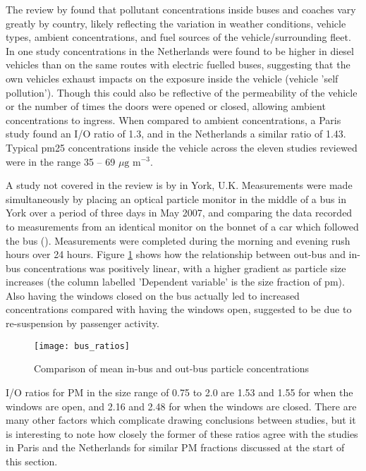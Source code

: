The review by \cite{Karanasiou2014} found that pollutant concentrations inside buses and coaches vary greatly by country, likely reflecting the variation in weather conditions, vehicle types, ambient concentrations, and fuel sources of the vehicle/surrounding fleet. In one study concentrations in the Netherlands were found to be higher in diesel vehicles than on the same routes with electric fuelled buses, suggesting that the own vehicles exhaust impacts on the exposure inside the vehicle (vehicle 'self pollution'). Though this could also be reflective of the permeability of the vehicle or the number of times the doors were opened or closed, allowing ambient concentrations to ingress. When compared to ambient concentrations, a Paris study found an I/O ratio of 1.3, and in the Netherlands a similar ratio of 1.43. Typical \gls{pm25} concentrations inside the vehicle across the eleven studies reviewed were in the range 35 -- 69 $\mu \text{g m}^{-3}$.

A study not covered in the review is by \cite{Song2009} in York, U.K. Measurements were made simultaneously by placing an optical particle monitor in the middle of a bus in York over a period of three days in May 2007, and comparing the data recorded to measurements from an identical monitor on the bonnet of a car which followed the bus (\cite{Song2009}). Measurements were completed during the morning and evening rush hours over 24 hours. Figure \ref{fig:bus_ratios} shows how the relationship between out-bus and in-bus concentrations was positively linear, with a higher gradient as particle size increases (the column labelled 'Dependent variable' is the size fraction of \gls{pm}). Also having the windows closed on the bus actually led to increased concentrations compared with having the windows open, suggested to be due to re-suspension by passenger activity. 

\begin{figure}[H]
\centering
\texttt{[image: bus\_ratios]}
\caption{Comparison of mean in-bus and out-bus particle concentrations}
\label{fig:bus_ratios}
\end{figure}

I/O ratios for PM in the size range of 0.75 to 2.0 are 1.53 and 1.55 for when the windows are open, and 2.16 and 2.48 for when the windows are closed. There are many other factors which complicate drawing conclusions between studies, but it is interesting to note how closely the former of these ratios agree with the studies in Paris and the Netherlands for similar PM fractions discussed at the start of this section. 


